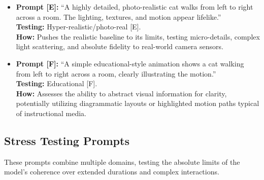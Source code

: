 \documentclass[sigconf]{acmart}
\begin{document}
\begin{itemize}
    \item \textbf{Prompt [E]:} ``A highly detailed, photo-realistic cat walks from left to right across a room. The lighting, textures, and motion appear lifelike.''
          \\ \textbf{Testing:} Hyper-realistic/photo-real [E].
          \\ \textbf{How:} Pushes the realistic baseline to its limits, testing micro-details, complex light scattering, and absolute fidelity to real-world camera sensors.

    \item \textbf{Prompt [F]:} ``A simple educational-style animation shows a cat walking from left to right across a room, clearly illustrating the motion.''
          \\ \textbf{Testing:} Educational [F].
          \\ \textbf{How:} Assesses the ability to abstract visual information for clarity, potentially utilizing diagrammatic layouts or highlighted motion paths typical of instructional media.
\end{itemize}

\subsection{Stress Testing Prompts}
These prompts combine multiple domains, testing the absolute limits of the model's coherence over extended durations and complex interactions.
\end{document}

